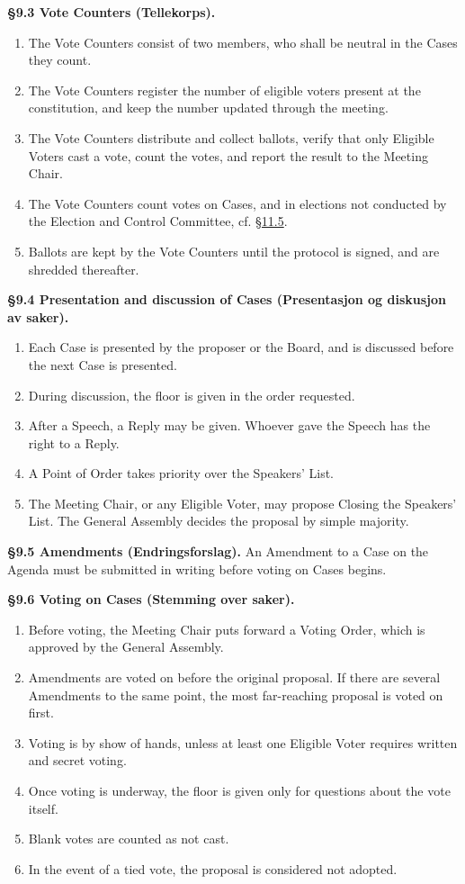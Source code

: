 \documentclass{../../../Common/Latex/Templates/rapport}
\begin{document}
\textbf{\S 9.3 Vote Counters (Tellekorps).}\label{bylaw:9.3}
\begin{enumerate}
  \item The Vote Counters consist of two members, who shall be neutral in the Cases they count.
  \item The Vote Counters register the number of eligible voters present at the constitution, and keep the number updated through the meeting.
  \item The Vote Counters distribute and collect ballots, verify that only Eligible Voters cast a vote, count the votes, and report the result to the Meeting Chair.
  \item The Vote Counters count votes on Cases, and in elections not conducted by the Election and Control Committee, cf. \hyperref[bylaw:11.5]{\S 11.5}.
  \item Ballots are kept by the Vote Counters until the protocol is signed, and are shredded thereafter.
\end{enumerate}

\textbf{\S 9.4 Presentation and discussion of Cases (Presentasjon og diskusjon av saker).}\label{bylaw:9.4}
\begin{enumerate}
  \item Each Case is presented by the proposer or the Board, and is discussed before the next Case is presented.
  \item During discussion, the floor is given in the order requested.
  \item After a Speech, a Reply may be given. Whoever gave the Speech has the right to a Reply.
  \item A Point of Order takes priority over the Speakers' List.
  \item The Meeting Chair, or any Eligible Voter, may propose Closing the Speakers' List. The General Assembly decides the proposal by simple majority.
\end{enumerate}

\textbf{\S 9.5 Amendments (Endringsforslag).}\label{bylaw:9.5} An Amendment to a Case on the Agenda must be submitted in writing before voting on Cases begins.

\textbf{\S 9.6 Voting on Cases (Stemming over saker).}\label{bylaw:9.6}
\begin{enumerate}
  \item Before voting, the Meeting Chair puts forward a Voting Order, which is approved by the General Assembly.
  \item Amendments are voted on before the original proposal. If there are several Amendments to the same point, the most far-reaching proposal is voted on first.
  \item Voting is by show of hands, unless at least one Eligible Voter requires written and secret voting.
  \item Once voting is underway, the floor is given only for questions about the vote itself.
  \item Blank votes are counted as not cast.
  \item In the event of a tied vote, the proposal is considered not adopted.
\end{enumerate}
\end{document}
